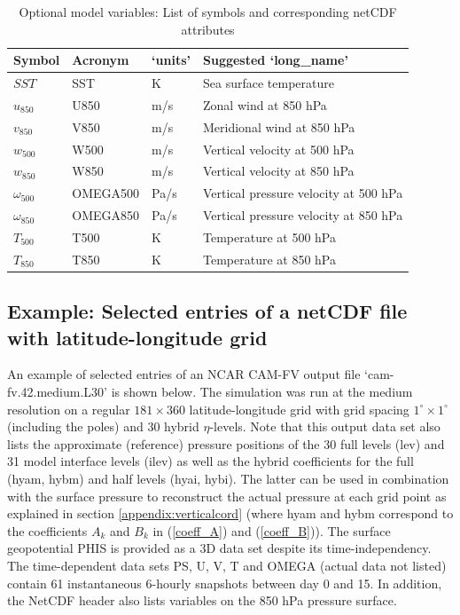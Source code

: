 \documentclass[times,doublespace]{fldauth}
\begin{document}
{\begin{appendix}
\begin{table}[h]
\caption{Optional model variables: List of symbols and corresponding netCDF attributes} \label{tab:netcdf_opt}
\begin{tabular*}{\textwidth}{@{\extracolsep{\fill}}llll}
\hline Symbol & Acronym & `units' & Suggested `long\_name'  \\ \hline 
$SST$ & SST & K & Sea surface temperature  \\
$u_{850}$ & U850 & m/s &  Zonal wind at 850 hPa   \\
$v_{850}$ & V850 & m/s & Meridional wind at 850 hPa  \\
$w_{500}$ & W500 &m/s &  Vertical velocity at 500 hPa   \\
$w_{850}$ & W850 &m/s &  Vertical velocity at 850 hPa   \\
$\omega_{500}$ & OMEGA500 & Pa/s &  Vertical pressure velocity at 500 hPa   \\
$\omega_{850}$ & OMEGA850 & Pa/s &  Vertical pressure velocity at 850 hPa   \\
$T_{500}$ & T500 & K & Temperature at 500 hPa  \\
$T_{850}$ & T850 & K & Temperature at 850 hPa  \\
\hline 
\end{tabular*}
\end{table}


\subsection{Example: Selected entries of a netCDF file with latitude-longitude grid}
\label{netcdf-example}
An example of selected entries of an NCAR CAM-FV output file `cam-fv.42.medium.L30'  is shown below. The simulation was run at the medium resolution on a regular $181 \times 360$ latitude-longitude grid with grid spacing $1^{\circ} \times 1^{\circ}$ (including the poles) and 30 hybrid $\eta$-levels. Note that this output data set also lists the approximate (reference) pressure positions of the 30 full levels (lev) and 31 model interface levels (ilev) as well as the hybrid coefficients for the full (hyam, hybm) and half levels (hyai, hybi). The latter can be used in combination with the surface pressure to reconstruct the actual pressure at each grid point as explained in section \ref{appendix:verticalcord} (where hyam and hybm correspond to the coefficients $A_k$ and $B_k$ in (\ref{coeff_A}) and (\ref{coeff_B})). The surface geopotential PHIS is provided as a 3D data set despite its time-independency. The time-dependent data sets PS, U, V, T and OMEGA (actual data not listed) contain 61 instantaneous 6-hourly snapshots between day 0 and 15. In addition, the NetCDF header also lists variables on the 850 hPa pressure surface.


\end{appendix}}
\end{document}
